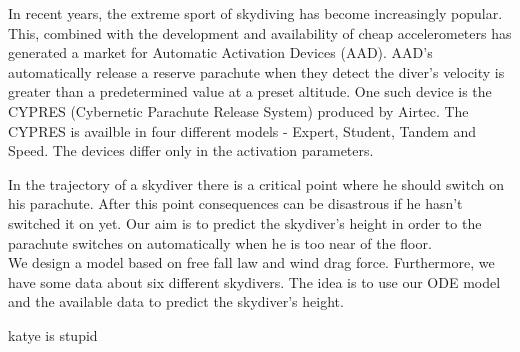 
In recent years, the extreme sport of skydiving has become increasingly popular. This, combined with the development 
and availability of cheap accelerometers has generated a market for Automatic Activation Devices (AAD). AAD's 
automatically release a reserve parachute when they detect the diver's velocity is greater than a predetermined
value at a preset altitude. One such device is the CYPRES (Cybernetic Parachute Release System) produced by Airtec.
The CYPRES is availble in four different models -  Expert, Student, Tandem and Speed. The devices differ only in the 
activation parameters.

In the trajectory of a skydiver there is a critical point where he should switch on his parachute. 
After this point consequences can be disastrous if he hasn't switched it on yet. 
Our aim is to predict the skydiver's height in order to the parachute switches on automatically when he is too near of 
the floor.\\
We design a model based on free fall law and wind drag force. 
Furthermore, we have some data about six different skydivers. 
The idea is to use our ODE model and the available data to predict the skydiver's height. 

katye is stupid
